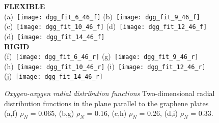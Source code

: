 \documentclass[12pt]{article}
\begin{document}
\begin{figure}[h!]
	\centering
	\textbf{FLEXIBLE} \\
	(a)~\texttt{[image: dgg\_fit\_6\_46\_f]} 
	(b)~\texttt{[image: dgg\_fit\_9\_46\_f]}
	(c)~\texttt{[image: dgg\_fit\_10\_46\_f]}
	(d)~\texttt{[image: dgg\_fit\_12\_46\_f]}
	(d)~\texttt{[image: dgg\_fit\_14\_46\_f]} \\  \vspace{-10pt} 
	\textbf{RIGID} \\
	(f)~\texttt{[image: dgg\_fit\_6\_46\_r]} 
	(g)~\texttt{[image: dgg\_fit\_9\_46\_r]}
	(h)~\texttt{[image: dgg\_fit\_10\_46\_r]}
	(i)~\texttt{[image: dgg\_fit\_12\_46\_r]}
	(j)~\texttt{[image: dgg\_fit\_14\_46\_r]}
	\caption{\textit{Oxygen-oxygen radial distribution functions} Two-dimensional radial distribution functions in the plane parallel to the graphene plates (a,f) \(\rho_N\) = 0.065, (b,g) \(\rho_N\) = 0.16, (c,h) \(\rho_N\) = 0.26, (d,i) \(\rho_N\) = 0.33.}
	\label{fig:dgg_distribution}
\end{figure}
\end{document}
